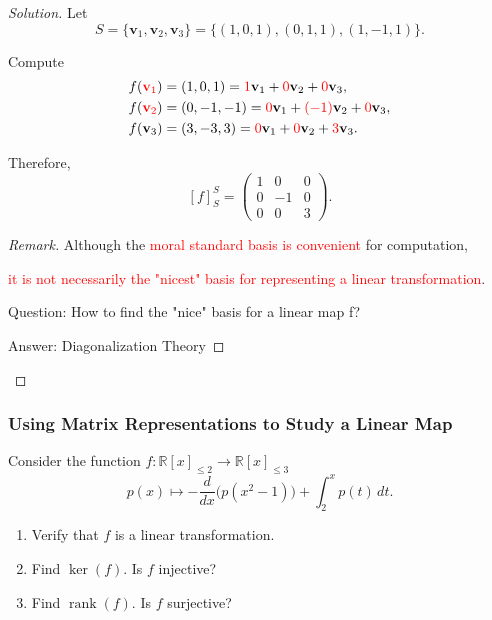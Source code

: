 \documentclass[12pt]{article}
\newenvironment{solution}
{\begin{proof}[Solution]}
{\end{proof}}
\newenvironment{Remark}
{\begin{proof}[Remark]}
{\end{proof}}
\begin{document}
\begin{solution}
Let
\[
S=\{\mathbf v_1,\mathbf v_2,\mathbf v_3\}=\{(1,0,1),(0,1,1),(1,-1,1)\}.
\]

Compute
\[
\begin{aligned}
f(\textcolor{red}{\mathbf v_1})
    &=(1,0,1)=\textcolor{red}{1}\mathbf v_1+\textcolor{red}{0}\mathbf v_2+\textcolor{red}{0}\mathbf v_3,\\
f(\textcolor{red}{\mathbf v_2})
    &=(0,-1,-1)=\textcolor{red}{0}\mathbf v_1+\textcolor{red}{(-1)}\mathbf v_2+\textcolor{red}{0}\mathbf v_3,\\
f(\mathbf v_3)
    &=(3,-3,3)=\textcolor{red}{0}\mathbf v_1+\textcolor{red}{0}\mathbf v_2+\textcolor{red}{3}\mathbf v_3.
\end{aligned}
\]

Therefore,
\[
[f]_S^S=
\begin{pmatrix}
1&0&0\\
0&-1&0\\
0&0&3
\end{pmatrix}.
\]

\begin{Remark}
Although the \textcolor{red}{moral standard basis is convenient} for computation, 

\textcolor{red}{it is not necessarily the "nicest" basis for representing a linear transformation}.

Question: How to find the "nice" basis for a linear map f?

Answer: Diagonalization Theory
\end{Remark}

\end{solution}

\subsubsection{Using Matrix Representations to Study a Linear Map}

Consider the function $f:\mathbb{R}[x]_{\le2}\longrightarrow\mathbb{R}[x]_{\le3}$
\[
p(x)\longmapsto-\frac{d}{dx}\bigl(p(x^2-1)\bigr)+\int_2^x p(t)\,dt.
\]

\begin{enumerate}
    \item[(a)] Verify that $f$ is a linear transformation.
    \item[(b)] Find $\ker(f)$. Is $f$ injective?
    \item[(c)] Find $\operatorname{rank}(f)$. Is $f$ surjective?
\end{enumerate}
\end{document}
